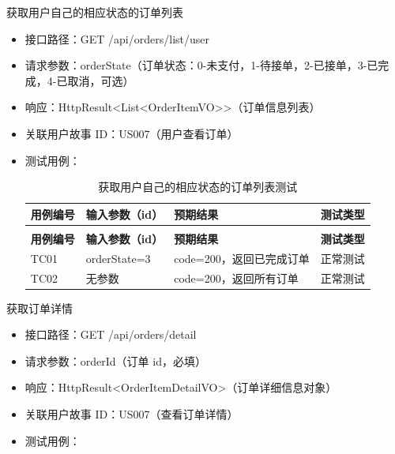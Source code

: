 \begin{levellist}
\begin{levellist}
        \item 获取用户自己的相应状态的订单列表
        \begin{itemize}
            \item 接口路径：GET /api/orders/list/user
            \item 请求参数：orderState（订单状态：0-未支付，1-待接单，2-已接单，3-已完成，4-已取消，可选）
            \item 响应：HttpResult<List<OrderItemVO>>（订单信息列表）
            \item 关联用户故事 ID：US007（用户查看订单）
            \item 测试用例：
                  \begin{longtable}{>{\centering\arraybackslash}m{1.7cm} >{\centering\arraybackslash}m{3cm} >{\centering\arraybackslash}m{6.3cm} >{\centering\arraybackslash}m{2cm}}

                      \caption{获取用户自己的相应状态的订单列表测试} \label{tab:training}                    \\

                      \toprule
                      \textbf{用例编号} & \textbf{输入参数（id）} & \textbf{预期结果}    & \textbf{测试类型} \\
                      \midrule
                      \endfirsthead

                      \multicolumn{4}{c}{{\tablename\ \thetable{} 续表}}                     \\
                      \toprule
                      \textbf{用例编号} & \textbf{输入参数（id）} & \textbf{预期结果}    & \textbf{测试类型} \\
                      \midrule
                      \endhead

                      \bottomrule
                      \endfoot


                      TC01          & orderState=3      & code=200，返回已完成订单 & 正常测试          \\
                      TC02          & 无参数               & code=200，返回所有订单  & 正常测试          \\
                  \end{longtable}
        \end{itemize}

        \item 获取订单详情
        \begin{itemize}
            \item 接口路径：GET /api/orders/detail
            \item 请求参数：orderId（订单 id，必填）
            \item 响应：HttpResult<OrderItemDetailVO>（订单详细信息对象）
            \item 关联用户故事 ID：US007（查看订单详情）
            \item 测试用例：
                  \begin{longtable}{>{\centering\arraybackslash}m{1.7cm} >{\centering\arraybackslash}m{3cm} >{\centering\arraybackslash}m{6.3cm} >{\centering\arraybackslash}m{2cm}}


\end{longtable}
\end{itemize}
\end{levellist}
\end{levellist}
